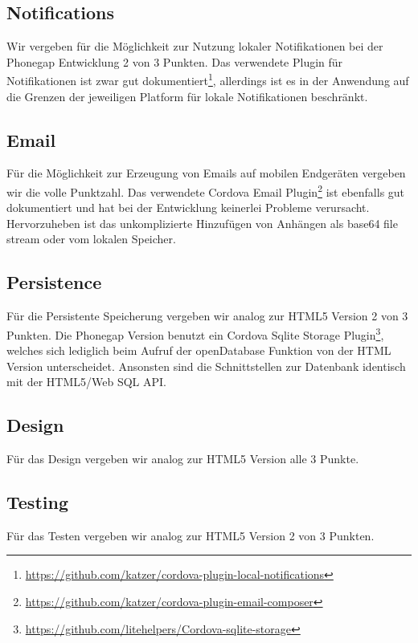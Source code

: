 \subsection{Notifications}
Wir vergeben für die Möglichkeit zur Nutzung lokaler Notifikationen bei der Phonegap Entwicklung 2 von 3 Punkten. Das verwendete Plugin für Notifikationen ist zwar gut dokumentiert\footnote{\url{https://github.com/katzer/cordova-plugin-local-notifications}}, allerdings ist es in der Anwendung auf die Grenzen der jeweiligen Platform für lokale Notifikationen beschränkt.

\subsection{Email}
Für die Möglichkeit zur Erzeugung von Emails auf mobilen Endgeräten vergeben wir die volle Punktzahl. Das verwendete Cordova Email Plugin\footnote{\url{https://github.com/katzer/cordova-plugin-email-composer}} ist ebenfalls gut dokumentiert und hat bei der Entwicklung keinerlei Probleme verursacht. Hervorzuheben ist das unkomplizierte Hinzufügen von Anhängen als base64 file stream oder vom lokalen Speicher.

\subsection{Persistence}
Für die Persistente Speicherung vergeben wir analog zur HTML5 Version 2 von 3 Punkten. Die Phonegap Version benutzt ein Cordova Sqlite Storage Plugin\footnote{\url{https://github.com/litehelpers/Cordova-sqlite-storage}}, welches sich lediglich beim Aufruf der openDatabase Funktion von der HTML Version unterscheidet. Ansonsten sind die Schnittstellen zur Datenbank identisch mit der HTML5/Web SQL API.

\subsection{Design}
Für das Design vergeben wir analog zur HTML5 Version alle 3 Punkte.

\subsection{Testing}
Für das Testen vergeben wir analog zur HTML5 Version 2 von 3 Punkten.
